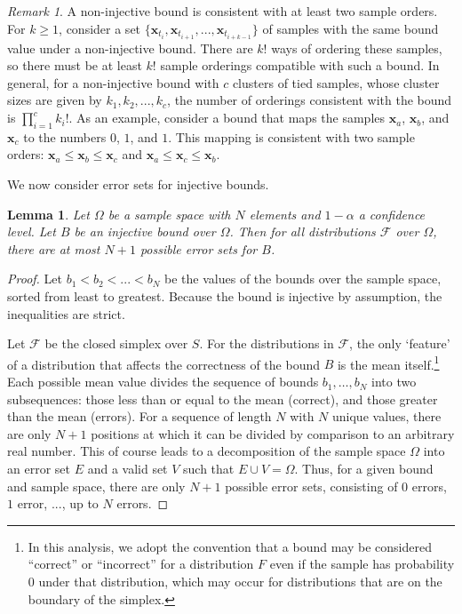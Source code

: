 \documentclass{article}
\newtheorem{lemma}[theorem]{Lemma}
\theoremstyle{definition}
\theoremstyle{remark}
\newtheorem{remark}[theorem]{Remark}
\newcounter{assumption}%
\def\x{\mathbf{x}}
\begin{document}
\begin{remark}
\label{remark:noninjective}
    A non-injective bound is consistent with at least two sample orders.  
    For $k \geq 1$, consider a set $\{\x_{t_i},\x_{t_{i+1}},...,\x_{t_{i+k-1}}\}$ of samples with the same bound value under a non-injective bound. There are $k!$ ways of ordering these samples, so there must be at least $k!$ sample orderings compatible with such a bound. In general, for a non-injective bound with $c$ clusters of tied samples, whose cluster sizes are given by $k_1,k_2,...,k_c$, the number of orderings consistent with the bound is $\prod_{i=1}^c k_i !$. 
    As an example, consider a bound that maps the samples $\x_a$, $\x_b$, and $\x_c$ to the numbers $0$, $1$, and $1$. This mapping is consistent with two sample orders:  $\x_a\leq \x_b \leq \x_c$ and $\x_a\leq \x_c \leq \x_b$. 
\end{remark}

We now consider error sets for injective bounds.

\begin{lemma}
\label{lem:numberOfErrorSets}
Let $\Omega$ be a sample space with $N$ elements and $1-\alpha$ a confidence level. 
Let $B$ be an injective bound over $\Omega$. Then for all distributions $\mathcal{F}$ over $\Omega$, there are at most $N+1$ possible error sets for $B$. 
\end{lemma}
\begin{proof}
Let $b_1< b_2< ...<b_N$ be the values of the bounds over the sample space, sorted from least to greatest. Because the bound is injective by assumption, the inequalities are strict.

Let $\mathcal{F}$ be the closed simplex over $S$. For the distributions in $\mathcal{F}$, the only `feature' of a distribution that affects the correctness of the bound $B$ is the mean itself.\footnote{In this analysis, we adopt the convention that a bound may be considered ``correct'' or     ``incorrect'' for a distribution $F$ even if the sample has probability 0 under that distribution, which may occur for distributions that are on the boundary of the simplex.} Each possible mean value divides the sequence of bounds $b_1, \ldots, b_N$ into two subsequences: those less than or equal to the mean (correct), and those greater than the mean (errors). For a sequence of length $N$ with $N$ unique values, there are only $N+1$ positions at which it can be divided by comparison to an arbitrary real number. This of course leads to a decomposition of the sample space $\Omega$ into an error set $E$ and a valid set $V$ such that $E \cup V = \Omega$. Thus, for a given bound and sample space, there are only $N+1$ possible error sets, consisting of $0$ errors, $1$ error, $...$, up to $N$ errors. 
\end{proof}
\end{document}
